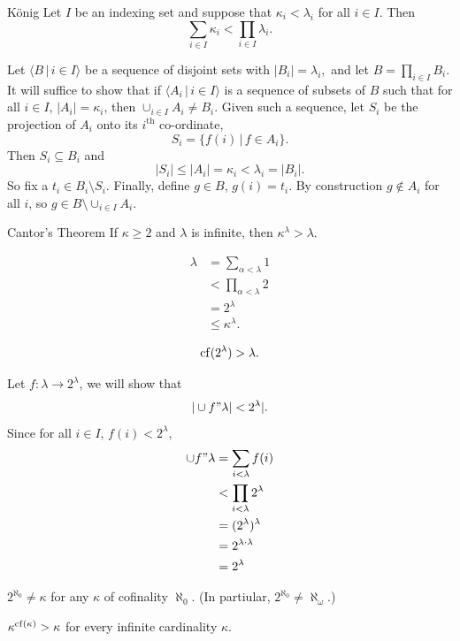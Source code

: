 \documentclass{article}
\begin{document}
\begin{fancythm}{K\"onig}
    Let $I$ be an indexing set and suppose that $\kappa_{i} < \lambda_{i}$ for all $i \in I$. Then \[ \sum_{i \in I} \kappa_{i} < \prod_{i \in I} \lambda_{i}.\]
\end{fancythm}
\proof Let $\langle B \, | \, i \in I \rangle$ be a sequence of disjoint sets with $|B_{i}| = \lambda_{i},$ and let $B = \prod_{i \in I} B_{i}$. It will suffice to show that if $\langle A_{i} \, | \, i \in I \rangle$ is a sequence of subsets of $B$ such that for all $i \in I$, $|A_{i}| = \kappa_{i}$, then $\cup_{i \in I} A_{i} \neq B_{i}$.\gap
Given such a sequence, let $S_{i}$ be the projection of $A_{i}$ onto its $i^{\text{th}}$ co-ordinate, \[ S_{i} = \{ f(i) \, | \, f \in A_{i}\}.\]
Then $S_{i} \subseteq B_{i}$ and \[|S_{i}| \leq |A_{i}| = \kappa_{i} < \lambda_{i} = |B_{i}|.\]
So fix a $t_{i} \in B_{i}\setminus S_{i}$. Finally, define $g \in B$, $g(i)=t_{i}$. By construction $g \notin A_{i}$ for all $i$, so $g \in B \setminus \cup_{i \in I} A_{i}$.
\endproof
\begin{corr}{Cantor's Theorem}
    If $\kappa \geq 2$ and $\lambda$ is infinite, then $\kappa^{\lambda} > \lambda$.
\end{corr}
\proof \hspace{0.1cm} \begin{align*}
    \lambda & = \sum_{\alpha < \lambda} 1              \\
            & < \prod_{\alpha<\lambda} 2 \tag{K\"onig} \\
            & =2^{\lambda}                             \\
            & \leq \kappa^{\lambda}.
\end{align*}
\endproof
\begin{corr}{}
    \[ \operatorname{cf}(2^{\lambda})>\lambda.\]
\end{corr}
\proof Let $f: \lambda \to 2^{\lambda}$, we will show that \[ |\cup f"\lambda| < 2^{\lambda}|.\]
Since for all $i \in I$, $f(i) < 2^{\lambda}$, \begin{align*}
    \cup f " \lambda & = \sum_{i < \lambda} f(i)        \\
                     & < \prod_{i< \lambda} 2^{\lambda} \\
                     & = (2^\lambda)^{\lambda}          \\
                     & = 2^{\lambda \cdot \lambda}      \\
                     & = 2^{\lambda}
\end{align*}
\endproof
\begin{corr}{}
    $2^{\aleph_{0}} \neq \kappa$ for any $\kappa$ of cofinality $\aleph_{0}$. (In partiular, $2^{\aleph_{0}} \neq \aleph_{\omega}$.)
\end{corr}
\begin{corr}{}
    $\kappa^{\operatorname{cf}(\kappa)}>\kappa$ for every infinite cardinality $\kappa$.
\end{corr}
\end{document}
